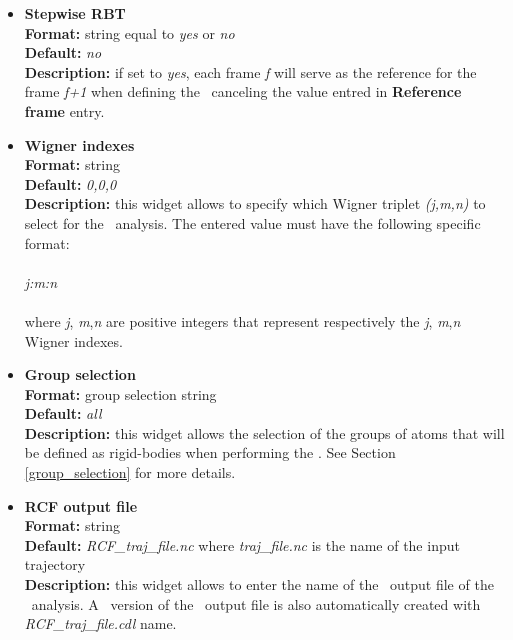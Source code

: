 \documentclass[a4paper,11pt]{report}
\begin{document}
\begin{itemize}
\hypertarget{rcf_stepwise_rbt}{}
\item \textbf{Stepwise RBT}\\
\textbf{Format:} string equal to \textit{yes} or \textit{no}\\
\textbf{Default:} \textit{no}\\
\textbf{Description:} if set to \textit{yes}, each frame \textit{f} will serve as the reference for the frame \textit{f+1} 
when defining the \RBT\ canceling the value entred in \textbf{Reference frame} entry.

\hypertarget{rcf_wigner_indexes}{}
\item \textbf{Wigner indexes}\\
\textbf{Format:} string\\
\textbf{Default:} \textit{0,0,0}\\
\textbf{Description:} this widget allows to specify which Wigner triplet \textit{(j,m,n)} to select for the \RCF\ analysis. 
The entered value must have the following specific format:
\\\\
\textit{j:m:n}
\\\\
where \textit{j}, \textit{m},\textit{n} are positive integers that represent respectively the \textit{j}, \textit{m},\textit{n} Wigner indexes.

\hypertarget{rcf_group_selection}{}
\item \textbf{Group selection}\\
\textbf{Format:} group selection string\\
\textbf{Default:} \textit{all}\\
\textbf{Description:} this widget allows the selection of the groups of atoms that will be defined as rigid-bodies when 
performing the \RCF . See Section \ref{group_selection} for more details.

\hypertarget{rcf_rcf_output_file}{}
\item \textbf{RCF output file}\\
\textbf{Format:} string\\
\textbf{Default:} \textit{RCF\_traj\_file.nc} where \textit{traj\_file.nc} is the name of the input trajectory\\
\textbf{Description:} this widget allows to enter the name of the \NetCDF\ output file of the \RCF\ analysis. A \CDL\ 
version of the \NetCDF\ output file is also automatically created with \textit{RCF\_traj\_file.cdl} name.
\end{itemize}
\end{document}
